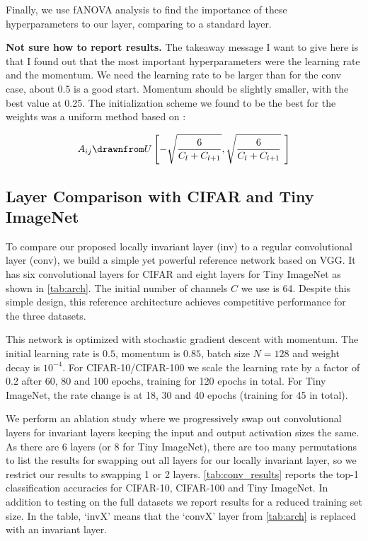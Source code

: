 Finally, we use fANOVA \cite{hutter_efficient_2014} analysis to find the
importance of these hyperparameters to our layer, comparing to a standard layer.

\textbf{Not sure how to report results.} The takeaway message I want to give
here is that I found out that the most important hyperparameters were the
learning rate and the momentum. We need the learning rate to be larger than for
the conv case, about 0.5 is a good start. Momentum should be slightly smaller,
with the best value at 0.25. The initialization scheme we found to be the best
for the weights was a uniform method based on \cite{glorot_understanding_2010}:

\begin{equation}
  A_{ij} \drawnfrom U\left[ -\sqrt{\frac{6}{C_l + C_{l+1}}}, \sqrt{\frac{6}{C_l + C_{l+1}}}\
  \right]
\end{equation}


\subsection{Layer Comparison with CIFAR and Tiny ImageNet}\label{sec:conv_exp}
To compare our proposed locally invariant layer (inv) to a regular convolutional
layer (conv), we build a simple yet powerful reference network based on VGG.
It has six convolutional layers for CIFAR and eight layers for Tiny ImageNet as shown in
\autoref{tab:arch}. The initial number of channels $C$ we use is 64. Despite
this simple design, this reference architecture achieves competitive performance
for the three datasets.

This network is optimized with stochastic gradient descent with momentum. The
initial learning rate is $0.5$, momentum is $0.85$, batch size $N=128$ and
weight decay is $10^{-4}$. For CIFAR-10/CIFAR-100 we scale the learning rate by
a factor of 0.2 after 60, 80 and 100 epochs, training for 120 epochs in total.
For Tiny ImageNet, the rate change is at 18, 30 and 40 epochs (training for 45 in total).



We perform an ablation study where we progressively swap out convolutional
layers for invariant layers keeping the input and output activation sizes the
same. As there are 6 layers (or 8 for Tiny ImageNet), there are too many
permutations to list the results for swapping out all layers for our locally
invariant layer, so we restrict our results to swapping 1 or 2 layers. 
\autoref{tab:conv_results} reports the top-1 classification accuracies for
CIFAR-10, CIFAR-100 and Tiny ImageNet. In addition to testing on the full
datasets we report results for a reduced training set size. In the table, `invX'
means that the `convX' layer from \autoref{tab:arch} is replaced with an 
invariant layer.

